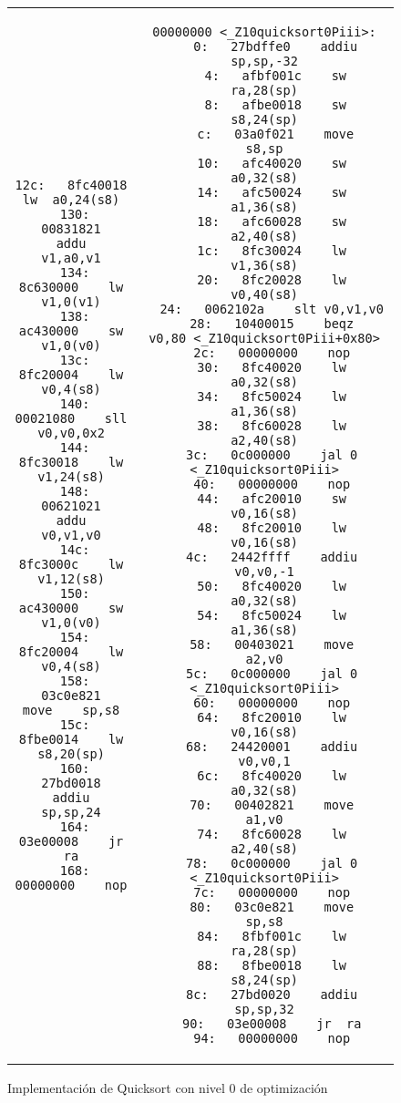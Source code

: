 \begin{figure}
\begin{center}
\begin{tabular}{c c}
\begin{minipage}[t]{.4\textwidth}
\begin{lstlisting}[language={[mips]Assembler},caption=colocar0,basicstyle=\ttfamily\tiny, tabsize=2]
 12c:	8fc40018 	lw	a0,24(s8)
 130:	00831821 	addu	v1,a0,v1
 134:	8c630000 	lw	v1,0(v1)
 138:	ac430000 	sw	v1,0(v0)
 13c:	8fc20004 	lw	v0,4(s8)
 140:	00021080 	sll	v0,v0,0x2
 144:	8fc30018 	lw	v1,24(s8)
 148:	00621021 	addu	v0,v1,v0
 14c:	8fc3000c 	lw	v1,12(s8)
 150:	ac430000 	sw	v1,0(v0)
 154:	8fc20004 	lw	v0,4(s8)
 158:	03c0e821 	move	sp,s8
 15c:	8fbe0014 	lw	s8,20(sp)
 160:	27bd0018 	addiu	sp,sp,24
 164:	03e00008 	jr	ra
 168:	00000000 	nop
		\end{lstlisting}
	\end{minipage} 
	&
	\begin{minipage}[t]{.4\textwidth}
		\begin{lstlisting}[language={[mips]Assembler},caption=quicksort0, basicstyle=\ttfamily\tiny, tabsize=2]
00000000 <_Z10quicksort0Piii>:
   0:	27bdffe0 	addiu	sp,sp,-32
   4:	afbf001c 	sw	ra,28(sp)
   8:	afbe0018 	sw	s8,24(sp)
   c:	03a0f021 	move	s8,sp
  10:	afc40020 	sw	a0,32(s8)
  14:	afc50024 	sw	a1,36(s8)
  18:	afc60028 	sw	a2,40(s8)
  1c:	8fc30024 	lw	v1,36(s8)
  20:	8fc20028 	lw	v0,40(s8)
  24:	0062102a 	slt	v0,v1,v0
  28:	10400015 	beqz	v0,80 <_Z10quicksort0Piii+0x80>
  2c:	00000000 	nop
  30:	8fc40020 	lw	a0,32(s8)
  34:	8fc50024 	lw	a1,36(s8)
  38:	8fc60028 	lw	a2,40(s8)
  3c:	0c000000 	jal	0 <_Z10quicksort0Piii>
  40:	00000000 	nop
  44:	afc20010 	sw	v0,16(s8)
  48:	8fc20010 	lw	v0,16(s8)
  4c:	2442ffff 	addiu	v0,v0,-1
  50:	8fc40020 	lw	a0,32(s8)
  54:	8fc50024 	lw	a1,36(s8)
  58:	00403021 	move	a2,v0
  5c:	0c000000 	jal	0 <_Z10quicksort0Piii>
  60:	00000000 	nop
  64:	8fc20010 	lw	v0,16(s8)
  68:	24420001 	addiu	v0,v0,1
  6c:	8fc40020 	lw	a0,32(s8)
  70:	00402821 	move	a1,v0
  74:	8fc60028 	lw	a2,40(s8)
  78:	0c000000 	jal	0 <_Z10quicksort0Piii>
  7c:	00000000 	nop
  80:	03c0e821 	move	sp,s8
  84:	8fbf001c 	lw	ra,28(sp)
  88:	8fbe0018 	lw	s8,24(sp)
  8c:	27bd0020 	addiu	sp,sp,32
  90:	03e00008 	jr	ra
  94:	00000000 	nop
		\end{lstlisting}
	\end{minipage} \\
\end{tabular}
\label{quick}
\end{center}
\caption{Implementación de Quicksort con nivel 0 de optimización}
\end{figure}


